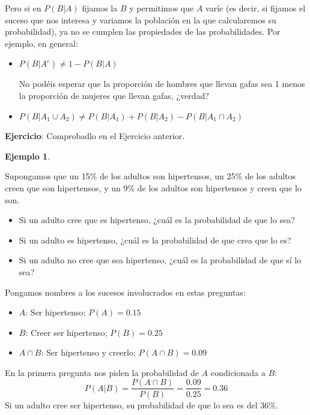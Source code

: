 \documentclass[
]{book}
\providecommand{\tightlist}{%
  \setlength{\itemsep}{0pt}\setlength{\parskip}{0pt}}
\theoremstyle{definition}
\theoremstyle{definition}
\newtheorem{example}{Ejemplo}[chapter]
\theoremstyle{definition}
\theoremstyle{definition}
\theoremstyle{remark}
\begin{document}
\begin{rmdcaution}
Pero si en \(P(B|A)\) fijamos la \(B\) y permitimos que \(A\) varíe (es decir, si fijamos el suceso que nos interesa y variamos la población en la que calcularemos su probabilidad), ya no se cumplen las propiedades de las probabilidades. Por ejemplo, en general:

\begin{itemize}
\item
  \(P(B|A^c)\neq 1-P(B|A)\)

  No podéis esperar que la proporción de hombres que llevan gafas sea 1 menos la proporción de mujeres que llevan gafas, ¿verdad?
\item
  \(P(B|A_1\cup A_2)\neq P(B|A_1)+P(B|A_2)-P(B|A_1\cap A_2)\)
\end{itemize}

\textbf{Ejercicio}: Comprobadlo en el Ejercicio anterior.
\end{rmdcaution}

\begin{example}
\protect\hypertarget{exm:unnamed-chunk-118}{}\label{exm:unnamed-chunk-118}

Supongamos que un 15\% de los adultos son hipertensos, un 25\% de los adultos creen que son hipertensos, y un 9\% de los adultos son hipertensos y creen que lo son.

\begin{itemize}
\tightlist
\item
  Si un adulto cree que es hipertenso, ¿cuál es la probabilidad de que lo sea?
\item
  Si un adulto es hipertenso, ¿cuál es la probabilidad de que crea que lo es?
\item
  Si un adulto no cree que sea hipertenso, ¿cuál es la probabilidad de que sí lo sea?
\end{itemize}

\end{example}

Pongamos nombres a los sucesos involucrados en estas preguntas:

\begin{itemize}
\item
  \(A\): Ser hipertenso; \(P(A)=0.15\)
\item
  \(B\): Creer ser hipertenso; \(P(B)=0.25\)
\item
  \(A\cap B\): Ser hipertenso y creerlo; \(P(A \cap B)=0.09\)
\end{itemize}

En la primera pregunta nos piden la probabilidad de \(A\) condicionada a \(B\):
\[
P(A|B)=\frac{P(A\cap B)}{P(B)}=\dfrac{0.09}{0.25}=0.36
\]
Si un adulto cree ser hipertenso, su probabilidad de que lo sea es del 36\%.
\end{document}
